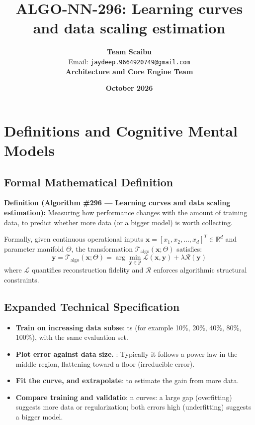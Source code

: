 \documentclass[11pt,a4paper]{article}
\title{\textbf{ALGO-NN-296: Learning curves and data scaling estimation}}
\author{\textbf{Team Scaibu} \\ \small Email: \texttt{jaydeep.9664920749@gmail.com} \\ \small \textbf{Architecture and Core Engine Team}}
\date{\textbf{October 2026}}
\theoremstyle{definition}
\begin{document}
\maketitle

\section{Definitions and Cognitive Mental Models}

\subsection{Formal Mathematical Definition}
\textbf{Definition (Algorithm \#296 --- Learning curves and data scaling estimation):}
Measuring how performance changes with the amount of training data, to predict whether more data (or a bigger model) is worth collecting.

Formally, given continuous operational inputs $\mathbf{x} = [x_1, x_2, \dots, x_d]^T \in \mathbb{R}^d$ and parameter manifold $\Theta$, the transformation $\mathcal{T}_{\text{algo}}(\mathbf{x}; \Theta)$ satisfies:
{\boldmath
\begin{equation}
\mathbf{y} = \mathcal{T}_{\text{algo}}(\mathbf{x}; \Theta) = \arg\min_{\mathbf{y} \in \mathcal{Y}} \mathcal{L}(\mathbf{x}, \mathbf{y}) + \lambda \mathcal{R}(\mathbf{y})
\end{equation}
}
where $\mathcal{L}$ quantifies reconstruction fidelity and $\mathcal{R}$ enforces algorithmic structural constraints.

\subsection{Expanded Technical Specification}
\begin{itemize}
\item \textbf{Train on increasing data subse}: ts (for example 10\%, 20\%, 40\%, 80\%, 100\%), with the same evaluation set.
\item \textbf{Plot error against data size. }: Typically it follows a power law in the middle region, flattening toward a floor (irreducible error).
\item \textbf{Fit the curve, and extrapolate}:  to estimate the gain from more data.
\item \textbf{Compare training and validatio}: n curves: a large gap (overfitting) suggests more data or regularization; both errors high (underfitting) suggests a bigger model.
\end{itemize}
\end{document}
